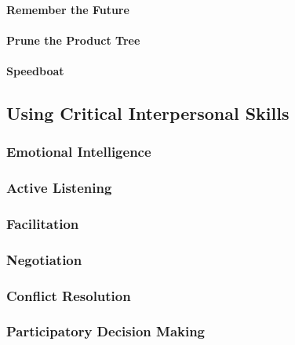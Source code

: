\documentclass[letterpaper,10pt,english]{jupyterBook}
\begin{document}
\paragraph{Remember the Future}
\label{\detokenize{APM/agile:remember-the-future}}

\paragraph{Prune the Product Tree}
\label{\detokenize{APM/agile:prune-the-product-tree}}

\paragraph{Speedboat}
\label{\detokenize{APM/agile:speedboat}}

\subsection{Using Critical Interpersonal Skills}
\label{\detokenize{APM/agile:using-critical-interpersonal-skills}}

\subsubsection{Emotional Intelligence}
\label{\detokenize{APM/agile:emotional-intelligence}}

\subsubsection{Active Listening}
\label{\detokenize{APM/agile:active-listening}}

\subsubsection{Facilitation}
\label{\detokenize{APM/agile:facilitation}}

\subsubsection{Negotiation}
\label{\detokenize{APM/agile:negotiation}}

\subsubsection{Conflict Resolution}
\label{\detokenize{APM/agile:conflict-resolution}}

\subsubsection{Participatory Decision Making}
\label{\detokenize{APM/agile:participatory-decision-making}}
\end{document}
